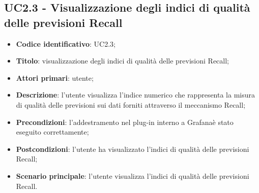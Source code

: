 \subsection{UC2.3 - Visualizzazione degli indici di qualità delle previsioni Recall}
\begin{itemize}
	\item \textbf{Codice identificativo}: UC2.3;
	\item \textbf{Titolo}: visualizzazione degli indici di qualità delle previsioni Recall\glo;
	\item \textbf{Attori primari}: utente;
	\item \textbf{Descrizione}: l'utente visualizza l'indice numerico che rappresenta la misura di qualità delle previsioni sui dati forniti attraverso il meccanismo Recall\glo;
	\item \textbf{Precondizioni}: l'addestramento nel plug-in interno a Grafana\glosp è stato eseguito correttamente;
	\item \textbf{Postcondizioni}: l'utente ha visualizzato l'indici di qualità delle previsioni Recall\glo;
	\item \textbf{Scenario principale}: l'utente visualizza l'indici di qualità delle previsioni Recall\glo.
\end{itemize} 
